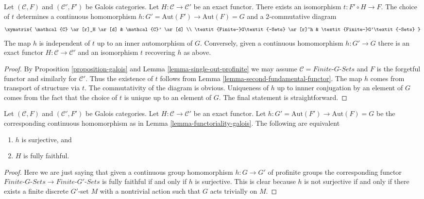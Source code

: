 \begin{lemma}
\label{lemma-functoriality-galois}
Let $(\mathcal{C}, F)$ and $(\mathcal{C}', F')$ be Galois categories.
Let $H : \mathcal{C} \to \mathcal{C}'$ be an exact functor.
There exists an isomorphism $t : F' \circ H \to F$.
The choice of $t$ determines a continuous homomorphism
$h : G' = \text{Aut}(F') \to \text{Aut}(F) = G$ and
a $2$-commutative diagram
$$
\xymatrix{
\mathcal{C} \ar[r]_H \ar[d] & \mathcal{C}' \ar[d] \\
\textit{Finite-}G\textit{-Sets} \ar[r]^h &
\textit{Finite-}G'\textit{-Sets}
}
$$
The map $h$ is independent of $t$ up
to an inner automorphism of $G$.
Conversely, given a continuous homomorphism $h : G' \to G$ there
is an exact functor $H : \mathcal{C} \to \mathcal{C}'$ and an
isomorphism $t$ recovering $h$ as above.
\end{lemma}

\begin{proof}
By Proposition \ref{proposition-galois} and
Lemma \ref{lemma-single-out-profinite} we may assume
$\mathcal{C} = \textit{Finite-}G\textit{-Sets}$ and $F$ is the
forgetful functor and similarly for $\mathcal{C}'$. Thus the existence of
$t$ follows from Lemma \ref{lemma-second-fundamental-functor}. The map $h$
comes from transport of structure via $t$. The commutativity of the
diagram is obvious. Uniqueness of $h$ up to innner conjugation by
an element of $G$ comes from the fact that the choice of $t$ is
unique up to an element of $G$. The final statement is straightforward.
\end{proof}

\begin{lemma}
\label{lemma-functoriality-galois-surjective}
Let $(\mathcal{C}, F)$ and $(\mathcal{C}', F')$ be Galois categories.
Let $H : \mathcal{C} \to \mathcal{C}'$ be an exact functor.
Let $h : G' = \text{Aut}(F') \to \text{Aut}(F) = G$ be the corresponding
continuous homomorphism as in Lemma \ref{lemma-functoriality-galois}.
The following are equivalent
\begin{enumerate}
\item $h$ is surjective, and
\item $H$ is fully faithful.
\end{enumerate}
\end{lemma}

\begin{proof}
Here we are just saying that given a continuous group homomorphism
$h : G \to G'$ of profinite groups the corresponding functor
$\textit{Finite-}G\textit{-Sets} \to \textit{Finite-}G'\textit{-Sets}$
is fully faithful if and only if $h$ is surjective. This is clear
because $h$ is not surjective if and only if there exists a finite discrete
$G'$-set $M$ with a nontrivial action such that $G$ acts trivially on $M$.
\end{proof}

